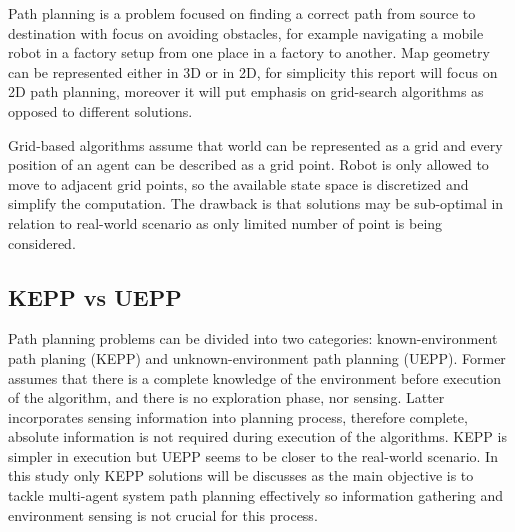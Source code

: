 Path planning is a problem focused on finding a correct path from source to destination with focus on avoiding obstacles, for example navigating a mobile robot in a factory setup from one place in a factory to another\cite{path_planning}. Map geometry can be represented either in 3D or in 2D, for simplicity this report will focus on 2D path planning, moreover it will put emphasis on grid-search algorithms as opposed to different solutions.

Grid-based algorithms assume that world can be represented as a grid and every position of an agent can be described as a grid point. Robot is only allowed to move to adjacent grid points, so the available state space is discretized and simplify the computation. The drawback is that solutions may be sub-optimal in relation to real-world scenario as only limited number of point is being considered\cite{SARANYA2014766}.

\subsection{KEPP vs UEPP}
Path planning problems can be divided into two categories: known-environment path planing
(KEPP) and unknown-environment path planning (UEPP). Former assumes that there is a complete knowledge of the environment before execution of the algorithm, and there is no exploration phase, nor sensing. Latter incorporates sensing information into planning process, therefore complete, absolute information is not required during execution of the algorithms. KEPP is simpler in execution but UEPP seems to be closer to the real-world scenario. In this study only KEPP solutions will be discusses as the main objective is to tackle multi-agent system path planning effectively so information gathering and environment sensing is not crucial for this process\cite{path_planning_protocols}.